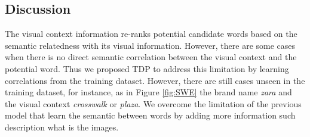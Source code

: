 \documentclass[phd,tocprelim]{cornell}
\begin{document}
\begin{table}
{\begin{tabular}{|l|c c c c|c| c c |c |}
  



  



\hline 
  






\hline  

\end{tabular}
}
\label{table_1} %
\end{table}





\subsection{Discussion}

The visual context information re-ranks potential candidate words based on the semantic relatedness with its visual information. However, there are some cases when there is no direct semantic correlation between the visual context and the potential word.  Thus we proposed TDP to address this limitation by learning correlations from the training dataset. However, there are still  cases unseen in the training dataset, for instance, as in Figure \ref{fig:SWE} the brand name \textit{zara} and the visual context \textit{crosswalk} or \textit{plaza}. We overcome the limitation of the previous model that learn the semantic between words by adding more information such description what is the images. 
\end{document}
